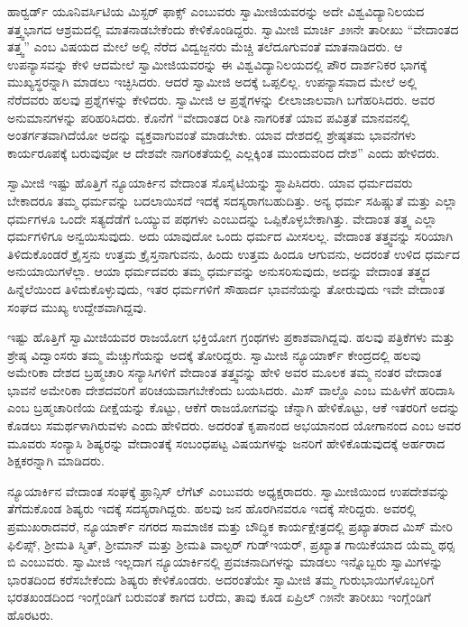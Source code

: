  ಹಾರ್‍ವರ್ಡ್ ಯೂನಿವರ್ಸಿಟಿಯ ಮಿಸ್ಟರ್ ಫಾಕ್ಸ್ ಎಂಬುವರು ಸ್ವಾಮೀಜಿಯವರನ್ನು ಅದೇ ವಿಶ್ವವಿದ್ಯಾನಿಲಯದ ತತ್ತ್ವಭಾಗದ ಆಶ್ರಮದಲ್ಲಿ ಮಾತನಾಡಬೇಕೆಂದು ಕೇಳಿಕೊಂಡಿದ್ದರು. ಸ್ವಾಮೀಜಿ ಮಾರ್ಚಿ ೨೫ನೇ ತಾರೀಖು “ವೇದಾಂತದ ತತ್ತ್ವ” ಎಂಬ ವಿಷಯದ ಮೇಲೆ ಅಲ್ಲಿ ನೆರೆದ ವಿದ್ವಜ್ಜನರು ಮೆಚ್ಚಿ ತಲೆದೂಗುವಂತೆ ಮಾತನಾಡಿದರು. ಆ ಉಪನ್ಯಾಸವನ್ನು ಕೇಳಿ ಆದಮೇಲೆ ಸ್ವಾಮೀಜಿಯವರನ್ನು ಈ ವಿಶ್ವವಿದ್ಯಾನಿಲಯದಲ್ಲಿ ಪೌರ ದಾರ್ಶನಿಕರ ಭಾಗಕ್ಕೆ ಮುಖ್ಯಸ್ಥರನ್ನಾಗಿ ಮಾಡಲು ಇಚ್ಛಿಸಿದರು. ಆದರೆ ಸ್ವಾಮೀಜಿ ಅದಕ್ಕೆ ಒಪ್ಪಲಿಲ್ಲ. ಉಪನ್ಯಾಸವಾದ ಮೇಲೆ ಅಲ್ಲಿ ನೆರೆದವರು ಹಲವು ಪ್ರಶ್ನೆಗಳನ್ನು ಕೇಳಿದರು. ಸ್ವಾಮೀಜಿ ಆ ಪ್ರಶ್ನೆಗಳನ್ನು ಲೀಲಾಜಾಲವಾಗಿ ಬಗೆಹರಿಸಿದರು. ಅವರ ಅನುಮಾನಗಳನ್ನು ಪರಿಹರಿಸಿದರು. ಕೊನೆಗೆ “ವೇದಾಂತದ ರೀತಿ ನಾಗರಿಕತೆ ಯಾವ ಪವಿತ್ರತೆ ಮಾನವನಲ್ಲಿ ಅಂತರ್ಗತವಾಗಿದೆಯೋ ಅದನ್ನು ವ್ಯಕ್ತವಾಗುವಂತೆ ಮಾಡಬೇಕು. ಯಾವ ದೇಶದಲ್ಲಿ ಶ್ರೇಷ್ಠತಮ ಭಾವನೆಗಳು ಕಾರ್ಯರೂಪಕ್ಕೆ ಬರುವುವೋ ಆ ದೇಶವೇ ನಾಗರಿಕತೆಯಲ್ಲಿ ಎಲ್ಲಕ್ಕಿಂತ ಮುಂದುವರಿದ ದೇಶ” ಎಂದು ಹೇಳಿದರು. 

 ಸ್ವಾಮೀಜಿ ಇಷ್ಟು ಹೊತ್ತಿಗೆ ನ್ಯೂಯಾರ್ಕಿನ ವೇದಾಂತ ಸೊಸೈಟಿಯನ್ನು ಸ್ಥಾಪಿಸಿದರು. ಯಾವ ಧರ್ಮದವರು ಬೇಕಾದರೂ ತಮ್ಮ ಧರ್ಮವನ್ನು ಬದಲಾಯಿಸದೆ ಇದಕ್ಕೆ ಸದಸ್ಯರಾಗಬಹುದಿತ್ತು. ಅನ್ಯ ಧರ್ಮ ಸಹಿಷ್ಣುತೆ ಮತ್ತು ಎಲ್ಲಾ ಧರ್ಮಗಳೂ ಒಂದೇ ಸತ್ಯದೆಡೆಗೆ ಒಯ್ಯುವ ಪಥಗಳು ಎಂಬುದನ್ನು ಒಪ್ಪಿಕೊಳ್ಳಬೇಕಾಗಿತ್ತು. ವೇದಾಂತ ತತ್ತ್ವ ಎಲ್ಲಾ ಧರ್ಮಗಳಿಗೂ ಅನ್ವಯಿಸುವುದು. ಅದು ಯಾವುದೋ ಒಂದು ಧರ್ಮದ ಮೀಸಲಲ್ಲ. ವೇದಾಂತ ತತ್ತ್ವವನ್ನು ಸರಿಯಾಗಿ ತಿಳಿದುಕೊಂಡರೆ ಕ್ರೈಸ್ತನು ಉತ್ತಮ ಕ್ರೈಸ್ತನಾಗುವನು, ಹಿಂದು ಉತ್ತಮ ಹಿಂದೂ ಆಗುವನು, ಅದರಂತೆ ಉಳಿದ ಧರ್ಮದ ಅನುಯಾಯಿಗಳೆಲ್ಲಾ. ಆಯಾ ಧರ್ಮದವರು ತಮ್ಮ ಧರ್ಮವನ್ನು ಅನುಸರಿಸುವುದು, ಅದನ್ನು ವೇದಾಂತ ತತ್ತ್ವದ ಹಿನ್ನೆಲೆಯಿಂದ ತಿಳಿದುಕೊಳ್ಳುವುದು, ಇತರ ಧರ್ಮಗಳಿಗೆ ಸೌಹಾರ್ದ ಭಾವನೆಯನ್ನು ತೋರುವುದು ಇವೇ ವೇದಾಂತ ಸಂಘದ ಮುಖ್ಯ ಉದ್ದೇಶವಾಗಿದ್ದವು. 

 ಇಷ್ಟು ಹೊತ್ತಿಗೆ ಸ್ವಾಮೀಜಿಯವರ ರಾಜಯೋಗ ಭಕ್ತಿಯೋಗ ಗ್ರಂಥಗಳು ಪ್ರಕಾಶವಾಗಿದ್ದವು. ಹಲವು ಪತ್ರಿಕೆಗಳು ಮತ್ತು ಶ್ರೇಷ್ಠ ವಿದ್ವಾಂಸರು ತಮ್ಮ ಮೆಚ್ಚುಗೆಯನ್ನು ಅದಕ್ಕೆ ತೋರಿದ್ದರು. ಸ್ವಾಮೀಜಿ ನ್ಯೂಯಾರ್ಕ್ ಕೇಂದ್ರದಲ್ಲಿ ಹಲವು ಅಮೇರಿಕಾ ದೇಶದ ಬ್ರಹ್ಮಚಾರಿ ಸನ್ಯಾಸಿಗಳಿಗೆ ವೇದಾಂತ ತತ್ತ್ವವನ್ನು ಹೇಳಿ ಅವರ ಮೂಲಕ ತಮ್ಮ ನಂತರ ವೇದಾಂತ ಭಾವನೆ ಅಮೇರಿಕಾ ದೇಶದವರಿಗೆ ಪರಿಚಯವಾಗಬೇಕೆಂದು ಬಯಸಿದರು. ಮಿಸ್ ವಾಲ್ಡೊ ಎಂಬ ಮಹಿಳೆಗೆ ಹರಿದಾಸಿ ಎಂಬ ಬ್ರಹ್ಮಚಾರಿಣಿಯ ದೀಕ್ಷೆಯನ್ನು ಕೊಟ್ಟು, ಆಕೆಗೆ ರಾಜಯೋಗವನ್ನು ಚೆನ್ನಾಗಿ ಹೇಳಿಕೊಟ್ಟು, ಆಕೆ ಇತರರಿಗೆ ಅದನ್ನು ಕೊಡಲು ಸಮರ್ಥಳಾಗಿರುವಳು ಎಂದು ಹೇಳಿದರು. ಅದರಂತೆ ಕೃಪಾನಂದ ಅಭಯಾನಂದ ಯೋಗಾನಂದ ಎಂಬ ಅವರ ಮೂವರು ಸಂನ್ಯಾಸಿ ಶಿಷ್ಯರನ್ನು ವೇದಾಂತಕ್ಕೆ ಸಂಬಂಧಪಟ್ಟ ವಿಷಯಗಳನ್ನು ಜನರಿಗೆ ಹೇಳಿಕೊಡುವುದಕ್ಕೆ ಅರ್ಹರಾದ ಶಿಕ್ಷಕರನ್ನಾಗಿ ಮಾಡಿದರು. 

 ನ್ಯೂಯಾರ್ಕಿನ ವೇದಾಂತ ಸಂಘಕ್ಕೆ ಫ್ರಾನ್ಸಿಸ್ ಲೆಗೆಟ್ ಎಂಬುವರು ಅಧ್ಯಕ್ಷರಾದರು. ಸ್ವಾಮೀಜಿಯಿಂದ ಉಪದೇಶವನ್ನು ತೆಗೆದುಕೊಂಡ ಶಿಷ್ಯರು ಇದಕ್ಕೆ ಸದಸ್ಯರಾಗಿದ್ದರು. ಹಲವು ಜನ ಹೊರಗಿನವರೂ ಇದಕ್ಕೆ ಸೇರಿದ್ದರು. ಅವರಲ್ಲಿ ಪ್ರಮುಖರಾದವರೆ, ನ್ಯೂಯಾರ್ಕ್ ನಗರದ ಸಾಮಾಜಿಕ ಮತ್ತು ಬೌದ್ಧಿಕ ಕಾರ್ಯಕ್ಷೇತ್ರದಲ್ಲಿ ಪ್ರಖ್ಯಾತರಾದ ಮಿಸ್ ಮೇರಿ ಫಿಲಿಪ್ಸ್, ಶ‍್ರೀಮತಿ ಸ್ಮಿತ್, ಶ‍್ರೀಮಾನ್ ಮತ್ತು ಶ‍್ರೀಮತಿ ವಾಲ್ಟರ್ ಗುಡ್‍ಇಯರ್, ಪ್ರಖ್ಯಾತ ಗಾಯಿಕೆಯಾದ ಯೆಮ್ಮ ಥರ‍್ಸ ಬಿ ಎಂಬುವರು. ಸ್ವಾಮೀಜಿ ಇಲ್ಲದಾಗ ನ್ಯೂಯಾರ್ಕಿನಲ್ಲಿ ಪ್ರವಚನಾದಿಗಳನ್ನು ಮಾಡಲು ಇನ್ನೊಬ್ಬರು ಸ್ವಾಮಿಗಳನ್ನು ಭಾರತದಿಂದ ಕರೆಸಬೇಕೆಂದು ಶಿಷ್ಯರು ಕೇಳಿಕೊಂಡರು. ಅದರಂತೆಯೇ ಸ್ವಾಮೀಜಿ ತಮ್ಮ ಗುರುಭಾಯಿಗಳೊಬ್ಬರಿಗೆ ಭರತಖಂಡದಿಂದ ಇಂಗ್ಲೆಂಡಿಗೆ ಬರುವಂತೆ ಕಾಗದ ಬರೆದು, ತಾವು ಕೂಡ ಏಪ್ರಿಲ್ ೧೫ನೇ ತಾರೀಖು ಇಂಗ್ಲೆಂಡಿಗೆ ಹೊರಟರು. 

